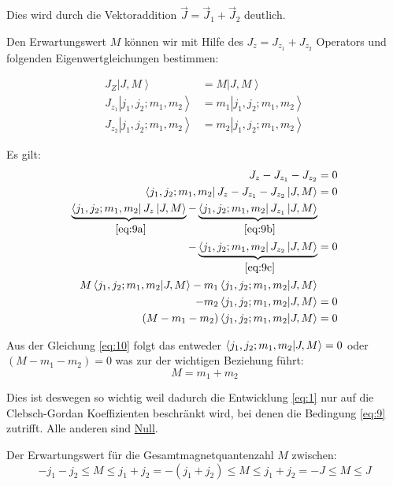 \documentclass[12pt,a4paper,titlepage,oneside]{article}
\newcommand\bra[1]{\left\langle #1 \right|}
\newcommand\ket[1]{\left| #1 \right\rangle}
\newcommand\braket[2]{%
  \left\langle \vphantom{#2} #1%
    \middle|%
    \vphantom{#1} #2\right\rangle}%
\begin{document}
Dies wird durch die Vektoraddition \(\vec J = \vec J_1+\vec J_2\) deutlich.

Den Erwartungswert \(M\) können wir mit Hilfe des \(J_z=J_{z_1}+J_{z_2}\)
Operators und folgenden Eigenwertgleichungen bestimmen:

\begin{subequations}
  \begin{align}
    J_Z\ket{J,M}&= M \ket{J,M} \label{eq:9a}\\
    J_{z_1}\ket{j_1,j_2;m_1,m_2}&=m_1\ket{j_1,j_2;m_1,m_2} \label{eq:9b}\\
    J_{z_2}\ket{j_1,j_2;m_1,m_2}&=m_2\ket{j_1,j_2;m_1,m_2} \label{eq:9c}
  \end{align}
\end{subequations}

Es gilt:
\begin{align}
  \label{eq:10}
  J_z-J_{z_1}-J_{z_2}&=0\notag\\
  \bra{j_1,j_2;m_1,m_2} J_z-J_{z_1}-J_{z_2} \ket{J,M} &=0\notag\\
  \underbrace{\bra{j_1,j_2;m_1,m_2} J_z\ket{J,M}}_{~\eqref{eq:9a}}
  -\underbrace{\bra{j_1,j_2;m_1,m_2}J_{z_1}\ket{J,M}}_{~\eqref{eq:9b}}\notag\\
  -\underbrace{\bra{j_1,j_2;m_1,m_2}J_{z_2} \ket{J,M}}_{~\eqref{eq:9c}}&=0\notag\\
  M\braket{j_1,j_2;m_1,m_2}{J,M}
  -m_1\braket{j_1,j_2;m_1,m_2}{J,M}\notag\\
  -m_2\braket{j_1,j_2;m_1,m_2}{J,M}&=0\notag\\
  (M-m_1-m_2)\braket{j_1,j_2;m_1,m_2}{J,M}&=0
\end{align}

Aus der Gleichung \eqref{eq:10} folgt das entweder
\(\braket{j_1,j_2;m_1,m_2}{J,M}=0\) oder\\ 
\((M-m_1-m_2)=0\) was zur der wichtigen Beziehung führt:
\begin{equation}
  \label{eq:9}
  \boxed{M=m_1+m_2}
\end{equation}

Dies ist deswegen so wichtig weil dadurch die Entwicklung \eqref{eq:1} nur
auf die Clebsch-Gordan Koeffizienten beschränkt wird, bei denen die Bedingung
\eqref{eq:9} zutrifft. Alle anderen sind \underline{Null}. 

Der Erwartungswert für die Gesamtmagnetquantenzahl \(M\) zwischen:
\begin{equation}
  \label{eq:11}
  -j_1-j_2\leq M \leq j_1+j_2=-(j_1+j_2)\leq M \leq j_1+j_2
  =-J\leq M \leq J
\end{equation}
\end{document}
